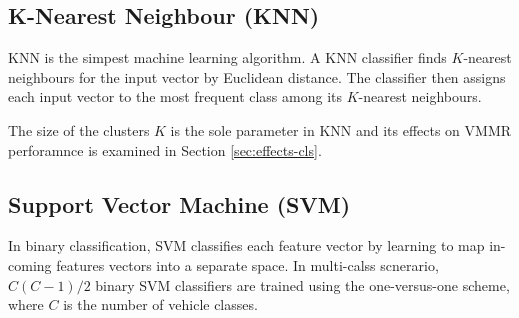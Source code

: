 \subsection{K-Nearest Neighbour (KNN)}
KNN is the simpest machine learning algorithm. 
A KNN classifier finds $K$-nearest neighbours for the input vector by Euclidean distance. 
The classifier then assigns each input vector to the most frequent class among its $K$-nearest neighbours.

The size of the clusters $K$ is the sole parameter in KNN and its effects on VMMR perforamnce is examined in Section \ref{sec:effects-cls}.

\subsection{Support Vector Machine (SVM)}
In binary classification, SVM classifies each feature vector by learning to map in-coming features vectors into a separate space.
In multi-calss scnerario, $C(C-1)/2$ binary SVM classifiers are trained using the one-versus-one scheme, where $C$ is the number of vehicle classes.



